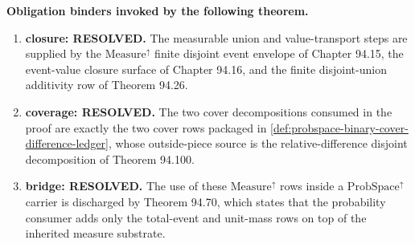\noindent\textbf{Obligation binders invoked by the following theorem.}
\begin{enumerate}
\item \textbf{closure: RESOLVED.} The measurable union and value-transport steps are supplied by the $\mathrm{Measure}^{\uparrow}$ finite disjoint event envelope of Chapter 94.15, the event-value closure surface of Chapter 94.16, and the finite disjoint-union additivity row of Theorem 94.26.
\item \textbf{coverage: RESOLVED.} The two cover decompositions consumed in the proof are exactly the two cover rows packaged in \autoref{def:probspace-binary-cover-difference-ledger}, whose outside-piece source is the relative-difference disjoint decomposition of Theorem 94.100.
\item \textbf{bridge: RESOLVED.} The use of these $\mathrm{Measure}^{\uparrow}$ rows inside a $\mathrm{ProbSpace}^{\uparrow}$ carrier is discharged by Theorem 94.70, which states that the probability consumer adds only the total-event and unit-mass rows on top of the inherited measure substrate.
\end{enumerate}

